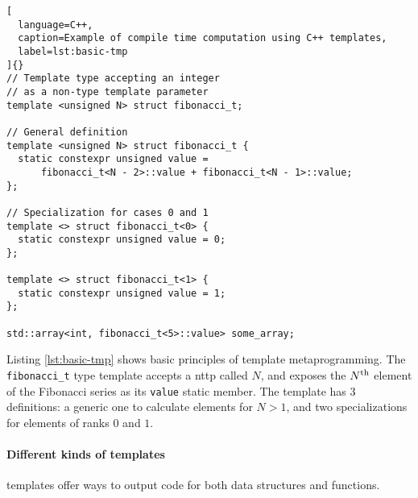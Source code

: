\documentclass[../main]{subfiles}
\begin{document}
\begin{lstlisting}[
  language=C++,
  caption=Example of compile time computation using C++ templates,
  label=lst:basic-tmp
]{}
// Template type accepting an integer
// as a non-type template parameter
template <unsigned N> struct fibonacci_t;

// General definition
template <unsigned N> struct fibonacci_t {
  static constexpr unsigned value =
      fibonacci_t<N - 2>::value + fibonacci_t<N - 1>::value;
};

// Specialization for cases 0 and 1
template <> struct fibonacci_t<0> {
  static constexpr unsigned value = 0;
};

template <> struct fibonacci_t<1> {
  static constexpr unsigned value = 1;
};

std::array<int, fibonacci_t<5>::value> some_array;
\end{lstlisting}

Listing \ref{lst:basic-tmp} shows basic principles of \cpp template
metaprogramming. The \lstinline{fibonacci_t} type template accepts a
\gls{nttp} called $N$, and exposes the
$N\textsuperscript{th}$ element of the Fibonacci series as its
\lstinline{value} static member. The template has 3 definitions:
a generic one to calculate elements for $N > 1$,
and two specializations for elements of ranks $0$ and $1$.

\paragraph{Different kinds of templates}

\cpp templates offer ways to output code for both data structures
and functions.
\end{document}

